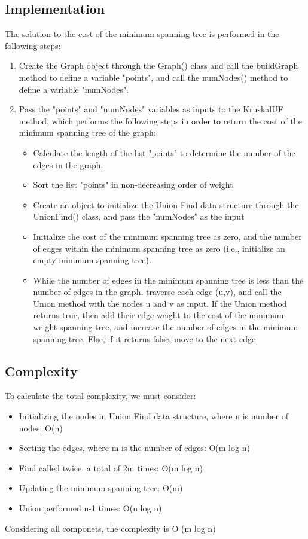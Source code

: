 	\subsection{Implementation}
	The solution to the cost of the minimum spanning tree is performed in the following steps:
	\begin{enumerate}
    \item Create the Graph object through the Graph() class and call the buildGraph method to define a variable "points", and call the numNodes() method to define a variable "numNodes". 
    \item Pass the "points" and "numNodes" variables as inputs to the KruskalUF method, which performs the following steps in order to return the cost of the minimum spanning tree of the graph:
    	\begin{itemize}
    	\item Calculate the length of the list "points" to determine the number of the edges in the graph. 
    	\item Sort the list "points" in non-decreasing order of weight 
    	\item Create an object to initialize the Union Find data structure through the UnionFind() class, and pass the "numNodes" as the input
    	\item Initialize the cost of the minimum spanning tree as zero, and the number of edges within the minimum spanning tree as zero (i.e., initialize an empty minimum spanning tree). 
    	\item While the number of edges in the minimum spanning tree is less than the number of edges in the graph, traverse each edge (u,v), and call the Union method with the nodes u and v as input. If the Union method returns true, then add their edge weight to the cost of the minimum weight spanning tree, and increase the number of edges in the minimum spanning tree. Else, if it returns false, move to the next edge.  
    	\end{itemize}
    \end{enumerate}	
		
	
	\subsection{Complexity}
    To calculate the total complexity, we must consider:
    \begin{itemize}
    \item Initializing the nodes in Union Find data structure, where n is number of nodes: O(n)
    \item Sorting the edges, where m is the number of edges: O(m log n)
    \item Find called twice, a total of 2m times: O(m log n) 
    \item Updating the minimum spanning tree: O(m)
    \item Union performed n-1 times: O(n log n)
    \end{itemize}
    Considering all componets, the complexity is O (m log n)
	

\pagebreak